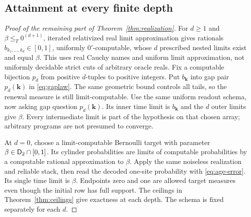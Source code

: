 \subsection{Attainment at every finite depth}
\begin{proof}[Proof of the remaining part of Theorem~\ref{thm:realization}]
For $d\geq1$ and $\beta\leq_T0^{(d+1)}$, iterated relativized
real limit approximation gives rationals
$b_{k_1,\ldots,k_d}\in[0,1]$, uniformly $0'$-computable, whose
$d$ prescribed nested limits exist and equal $\beta$. This uses
real Cauchy names and uniform limit approximation, not uniformly
decidable strict cuts of arbitrary oracle reals. Fix a computable
bijection $p_d$ from positive $d$-tuples to positive integers.
Put $b_{\mathbf k}$ into gap pair $p_d(\mathbf k)$ in
\eqref{eq:gaplaw}. The same geometric bound controls all tails,
so the renewal measure is still limit-computable. Use the same
uniform readout schema, now asking gap question $p_d(\mathbf k)$.
Its inner time limit is $b_{\mathbf k}$ and the $d$ outer limits
give $\beta$. Every intermediate limit is part of the hypothesis
on that chosen array; arbitrary programs are not presumed to
converge.

At $d=0$, choose a limit-computable Bernoulli target with parameter
$\beta\in\mathsf D_2\cap[0,1]$. Its cylinder probabilities are limits of
computable probabilities by a computable rational approximation to
$\beta$. Apply the same noiseless realization and reliable stack,
then read the decoded one-site probability with \eqref{eq:age-error}.
Its single time limit is $\beta$. Endpoints zero and one are
allowed target measures even though the initial row has full support.
The ceilings in Theorem~\ref{thm:ceilings} give exactness at each
depth. The schema is fixed separately for each $d$.
\end{proof}
